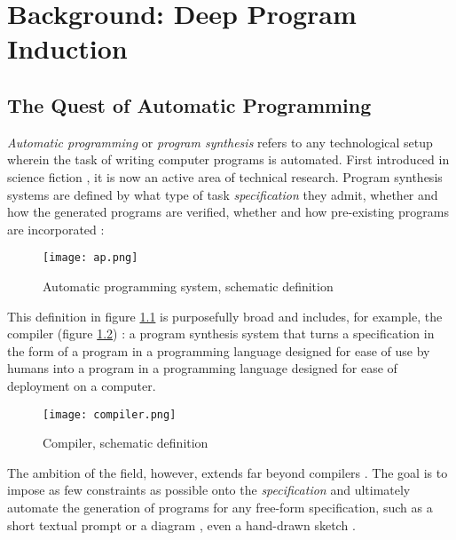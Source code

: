 \chapter{Background: Deep Program Induction} 
\label{ch:promise}

\section{The Quest of Automatic Programming}

\label{sec:quest}

\emph{Automatic programming} or \emph{program synthesis} refers to any technological setup wherein the task of writing computer programs is automated. 
First introduced in science fiction \cite{jenkinsLogicNamedJoe1946}, it is now an active area of technical research.
Program synthesis systems are defined by what type of task \emph{specification} they admit, whether and how the generated programs are verified, whether and how pre-existing programs are incorporated \cite{gulwaniDimensionsProgramSynthesis2010}:

\begin{figure}[H]
    \centering
    \texttt{[image: ap.png]}
    \caption{Automatic programming system, schematic definition}
    \label{fig:ap}
\end{figure}

This definition in figure \ref{fig:ap} is purposefully broad and includes, for example, the compiler (figure \ref{fig:compiler}) \cite{penjamDeductiveInductiveMethods2003,patrickmckenzie[@patio11]GlibLineHave2023}: a program synthesis system that turns a specification in the form of a program in a programming language designed for ease of use by humans into a program in a programming language designed for ease of deployment on a computer.

\begin{figure}[H]
    \centering
    \texttt{[image: compiler.png]}
    \caption{Compiler, schematic definition}
    \label{fig:compiler}
\end{figure}

The ambition of the field, however, extends far beyond compilers \cite{campbellAutomatedCodingQuest2020}.
The goal is to impose as few constraints as possible onto the \emph{specification} and ultimately automate the generation of programs for any free-form specification, such as a short textual \cite{zanLargeLanguageModels2023} prompt or a diagram \cite{koziolekLLMbasedControlCode2023}, even a hand-drawn sketch \cite{chatgptmodderChatgptCanNow2023}.

